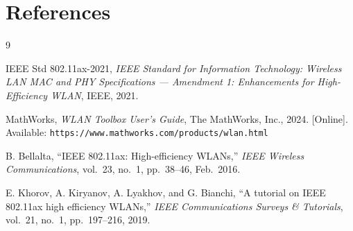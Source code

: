 \documentclass[twocolumn]{article}
\begin{document}
\section{References}

\begin{thebibliography}{9}

    IEEE Std 802.11ax-2021, \textit{IEEE Standard for Information Technology: Wireless LAN MAC and PHY Specifications — Amendment 1: Enhancements for High-Efficiency WLAN}, IEEE, 2021.

    MathWorks, \textit{WLAN Toolbox User's Guide}, The MathWorks, Inc., 2024. [Online]. Available: \texttt{https://www.mathworks.com/products/wlan.html}

    B. Bellalta, ``IEEE 802.11ax: High-efficiency WLANs,'' \textit{IEEE Wireless Communications}, vol.~23, no.~1, pp.~38--46, Feb.~2016.

    E. Khorov, A. Kiryanov, A. Lyakhov, and G. Bianchi, ``A tutorial on IEEE 802.11ax high efficiency WLANs,'' \textit{IEEE Communications Surveys \& Tutorials}, vol.~21, no.~1, pp.~197--216, 2019.

\end{thebibliography}
\end{document}
